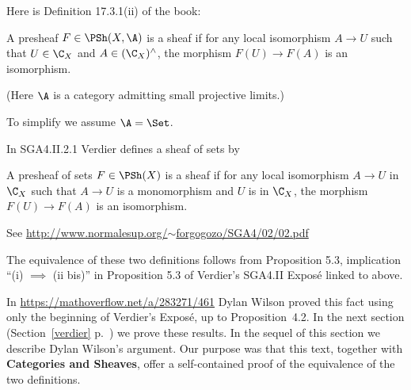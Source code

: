 \documentclass[12pt]{article}
\theoremstyle{remark}
\theoremstyle{definition}
\begin{document}


Here is Definition 17.3.1(ii) of the book: 

\begin{df}\label{sheaf}
A presheaf $F\in\PSh(X,\A)$ is a sheaf if for any local isomorphism $A\to U$ such that $U\in\C_X$ and $A\in(\C_X)^\wedge$, the morphism $F(U)\to F(A)$ is an isomorphism.
\end{df}

(Here $\A$ is a category admitting small projective limits.)

To simplify we assume $\A=\Set$.

In SGA4.II.2.1 Verdier defines a sheaf of sets by 

\begin{df}\label{faisceau}
A presheaf of sets $F\in\PSh(X)$ is a sheaf if for any local isomorphism $A\to U$ in $\C_X$ such that $A\to U$ is a monomorphism and $U$ is in $\C_X$, the morphism $F(U)\to F(A)$ is an isomorphism. 
\end{df} 

See \href{http://www.normalesup.org/~forgogozo/SGA4/02/02.pdf}{http://www.normalesup.org/$\sim$forgogozo/SGA4/02/02.pdf}

The equivalence of these two definitions follows from Proposition 5.3, implication ``(i) $\implies$ (ii bis)'' in Proposition 5.3 of Verdier's SGA4.II Exposé linked to above.

In \href{https://mathoverflow.net/a/283271/461}{https://mathoverflow.net/a/283271/461} Dylan Wilson %
proved this fact using only %
the beginning of Verdier's Exposé, up to Proposition~4.2. In the next section (Section~\ref{verdier} p.~\pageref{verdier}) we prove these results. In the sequel of this section we describe Dylan Wilson's argument. Our purpose was that this text, together with \textbf{Categories and Sheaves}, offer a self-contained proof of the equivalence of the two definitions.
\end{document}
